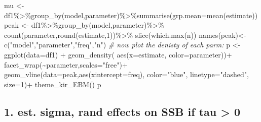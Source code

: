 \documentclass[
]{article}
\newenvironment{Shaded}{\begin{snugshade}}{\end{snugshade}}
\newcommand{\AttributeTok}[1]{\textcolor[rgb]{0.77,0.63,0.00}{#1}}
\newcommand{\CommentTok}[1]{\textcolor[rgb]{0.56,0.35,0.01}{\textit{#1}}}
\newcommand{\DecValTok}[1]{\textcolor[rgb]{0.00,0.00,0.81}{#1}}
\newcommand{\FunctionTok}[1]{\textcolor[rgb]{0.00,0.00,0.00}{#1}}
\newcommand{\NormalTok}[1]{#1}
\newcommand{\OtherTok}[1]{\textcolor[rgb]{0.56,0.35,0.01}{#1}}
\newcommand{\SpecialCharTok}[1]{\textcolor[rgb]{0.00,0.00,0.00}{#1}}
\newcommand{\StringTok}[1]{\textcolor[rgb]{0.31,0.60,0.02}{#1}}
\begin{document}
\begin{Shaded}
\begin{Highlighting}[]
\NormalTok{  mu   }\OtherTok{\textless{}{-}}\NormalTok{ df1}\SpecialCharTok{\%\textgreater{}\%}\FunctionTok{group\_by}\NormalTok{(model,parameter)}\SpecialCharTok{\%\textgreater{}\%}\FunctionTok{summarise}\NormalTok{(}\AttributeTok{grp.mean=}\FunctionTok{mean}\NormalTok{(estimate))}
\NormalTok{  peak }\OtherTok{\textless{}{-}}\NormalTok{ df1}\SpecialCharTok{\%\textgreater{}\%}\FunctionTok{group\_by}\NormalTok{(model,parameter)}\SpecialCharTok{\%\textgreater{}\%}
    \FunctionTok{count}\NormalTok{(parameter,}\FunctionTok{round}\NormalTok{(estimate,}\DecValTok{1}\NormalTok{))}\SpecialCharTok{\%\textgreater{}\%}
    \FunctionTok{slice}\NormalTok{(}\FunctionTok{which.max}\NormalTok{(n))}
  \FunctionTok{names}\NormalTok{(peak)}\OtherTok{\textless{}{-}} \FunctionTok{c}\NormalTok{(}\StringTok{"model"}\NormalTok{,}\StringTok{"parameter"}\NormalTok{,}\StringTok{"freq"}\NormalTok{,}\StringTok{"n"}\NormalTok{)}
  \CommentTok{\# now plot the denisty of each parm:}
\NormalTok{  p }\OtherTok{\textless{}{-}}
    \FunctionTok{ggplot}\NormalTok{(}\AttributeTok{data=}\NormalTok{df1) }\SpecialCharTok{+}
    \FunctionTok{geom\_density}\NormalTok{( }\FunctionTok{aes}\NormalTok{(}\AttributeTok{x=}\NormalTok{estimate, }\AttributeTok{color=}\NormalTok{parameter))}\SpecialCharTok{+}
    \FunctionTok{facet\_wrap}\NormalTok{(}\SpecialCharTok{\textasciitilde{}}\NormalTok{parameter,}\AttributeTok{scales=}\StringTok{"free"}\NormalTok{)}\SpecialCharTok{+} 
    \FunctionTok{geom\_vline}\NormalTok{(}\AttributeTok{data=}\NormalTok{peak,}\FunctionTok{aes}\NormalTok{(}\AttributeTok{xintercept=}\NormalTok{freq),}
              \AttributeTok{color=}\StringTok{"blue"}\NormalTok{, }\AttributeTok{linetype=}\StringTok{"dashed"}\NormalTok{, }\AttributeTok{size=}\DecValTok{1}\NormalTok{)}\SpecialCharTok{+}
    \FunctionTok{theme\_kir\_EBM}\NormalTok{()}
\NormalTok{  p}
\end{Highlighting}
\end{Shaded}

\hypertarget{est.-sigma-rand-effects-on-ssb-if-tau-0}{%
\subsection{1. est. sigma, rand effects on SSB if tau \textgreater{}
0}\label{est.-sigma-rand-effects-on-ssb-if-tau-0}}
\end{document}
